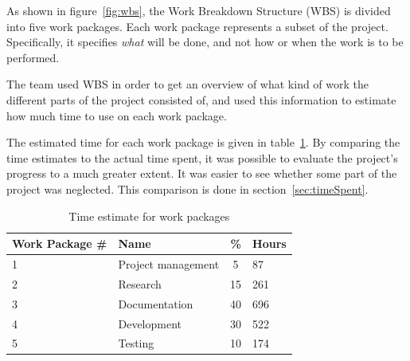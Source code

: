 As shown in figure~\ref{fig:wbs}, the Work Breakdown Structure (WBS) is divided into five work packages. Each work package represents a subset of the project. Specifically, it specifies \emph{what} will be done, and not how or when the work is to be performed.

The team used WBS in order to get an overview of what kind of work the different parts of the project consisted of, and used this information to estimate how much time to use on each work package.

The estimated time for each work package is given in table~\ref{tab:timeEstWP}. By comparing the time estimates to the actual time spent, it was possible to evaluate the project's progress to a much greater extent. It was easier to see whether some part of the project was neglected. This comparison is done in section~\ref{sec:timeSpent}.


\begin{table}[H]
\centering
{}
\begin{tabular}{|l|l|c|l|}
\hline
    \textbf{Work Package \#} & \textbf{Name} & \textbf{\%} & \textbf{Hours} \\\hline
    1 & Project management & 5 & 87\\\hline
    2 & Research		   & 15 & 261\\\hline
    3 & Documentation	   & 40 & 696\\\hline
    4 & Development 	   & 30 & 522\\\hline
    5 & Testing  		   & 10 & 174\\\hline
\end{tabular}
\caption{Time estimate for work packages}
\label{tab:timeEstWP}
\end{table}
